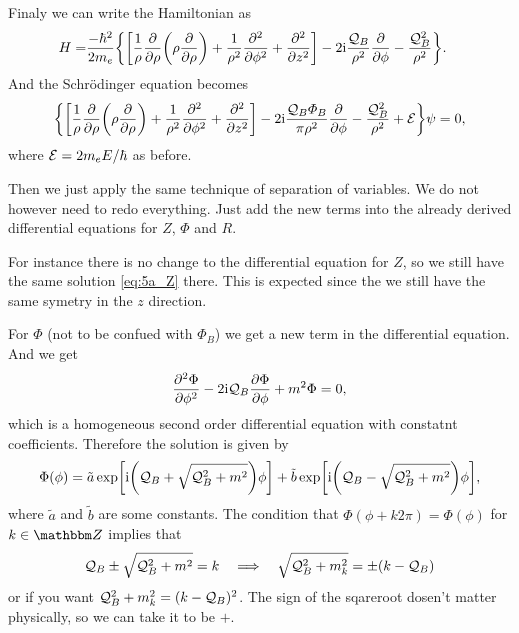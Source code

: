 \documentclass[11pt,letter, swedish, english
]{article}
\begin{document}
Finaly we can write the Hamiltonian as
\begin{equation}
\begin{aligned}
H=&\frac{-\hbar^2}{2m_e}\qty{\qty[
\frac{1}{\rho}\pdv{\rho}\qty(\rho\pdv{\rho})
+\frac{1}{\rho^2}\pdv[2]{\phi} + \pdv[2]{z}]
-2\mathrm{i}\frac{\ensuremath{\mathcal{Q}_B}}{\rho^2}\pdv{\phi}
-\frac{\ensuremath{\mathcal{Q}_B}^2}{\rho^2} }.
\end{aligned}
\end{equation}
And the Schrödinger equation becomes
\begin{equation}
\qty{ \qty[
\frac{1}{\rho}\pdv{\rho}\qty(\rho\pdv{\rho})
+\frac{1}{\rho^2}\pdv[2]{\phi} + \pdv[2]{z}]
-2\mathrm{i}\frac{\ensuremath{\mathcal{Q}_B}\varPhi_B}{\pi\rho^2}\pdv{\phi}
-\frac{\ensuremath{\mathcal{Q}_B}^2}{\rho^2} +\ensuremath{\mathcal{E}}}\psi=0,
\end{equation}
where $\mathcal{E}=2m_eE/\hbar$ as before.

Then we just apply the same technique of separation of variables. We
do not however need to redo everything. Just add the new terms into
the already derived differential equations for $Z$, $\Phi$ and $R$.

For instance there is no
change to the differential equation for $Z$, so we still have the same
solution \eqref{eq:5a_Z} there. This is expected since the we still
have the same symetry in the $z$ direction.

For $\Phi$ (not to be confued with $\varPhi_B$) we get a new term in
the differential equation. And we get
\begin{equation}
\pdv[2]{\Phi}{\phi} - 2\mathrm{i}\mathcal{Q}_B \pdv{\Phi}{\phi} + m^2\Phi =  0,
\end{equation}
which is a homogeneous second order differential equation with
constatnt coefficients. Therefore the solution is given by
\begin{equation}
\Phi(\phi)=\tilde{a}\exp[\mathrm{i}\qty(\mathcal{Q}_B+\sqrt{\mathcal{Q}_B^2+m^2})\phi]
+\tilde{b}\exp[\mathrm{i}\qty(\mathcal{Q}_B-\sqrt{\mathcal{Q}_B^2+m^2})\phi],
\end{equation}
where $\tilde{a}$ and $\tilde{b}$ are some constants.
The condition that $\Phi(\phi+k2\pi)=\Phi(\phi)$ for $k\in\Z$ implies
that
\begin{equation}\label{eq:5_mk}
\mathcal{Q}_B\pm\sqrt{\mathcal{Q}_B^2+m^2}=k
\quad\Longrightarrow\quad
\sqrt{\mathcal{Q}_B^2+m^2_k}=\pm(k-\mathcal{Q}_B)
\end{equation}
or if you want $\mathcal{Q}_B^2+m^2_k=(k-\mathcal{Q}_B)^2$. The sign of the sqareroot
dosen't matter physically, so we can take it to be $+$.
\end{document}
